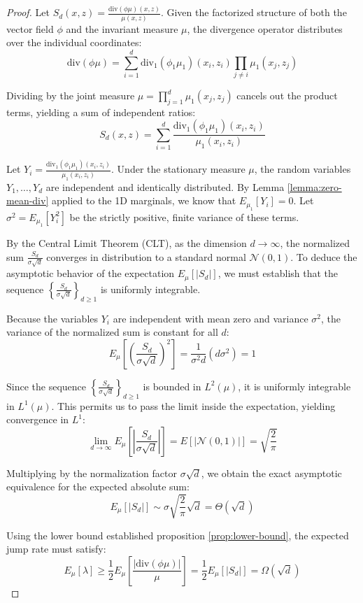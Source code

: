 \documentclass{article}
\begin{document}
\begin{proof}
    Let $S_d(x,z) = \frac{\text{div}(\phi \mu)(x,z)}{\mu(x,z)}$. Given the factorized structure of both the vector field $\phi$ and the invariant measure $\mu$, the divergence operator distributes over the individual coordinates:
    $$ \text{div}(\phi\mu) = \sum_{i=1}^d \text{div}_1(\phi_1 \mu_1)(x_i, z_i) \prod_{j \neq i} \mu_1(x_j, z_j) $$

    Dividing by the joint measure $\mu = \prod_{j=1}^d \mu_1(x_j, z_j)$ cancels out the product terms, yielding a sum of independent ratios:
    $$ S_d(x,z) = \sum_{i=1}^d \frac{\text{div}_1(\phi_1 \mu_1)(x_i, z_i)}{\mu_1(x_i, z_i)} $$

    Let $Y_i = \frac{\text{div}_1(\phi_1 \mu_1)(x_i, z_i)}{\mu_1(x_i, z_i)}$. Under the stationary measure $\mu$, the random variables $Y_1, \dots, Y_d$ are independent and identically distributed. By Lemma \ref{lemma:zero-mean-div} applied to the 1D marginals, we know that $E_{\mu_1}[Y_i] = 0$. Let $\sigma^2 = E_{\mu_1}[Y_i^2]$ be the strictly positive, finite variance of these terms.

    By the Central Limit Theorem (CLT), as the dimension $d \to \infty$, the normalized sum $\frac{S_d}{\sigma \sqrt{d}}$ converges in distribution to a standard normal $\mathcal{N}(0, 1)$. To deduce the asymptotic behavior of the expectation $E_\mu[|S_d|]$, we must establish that the sequence $\left\{ \frac{S_d}{\sigma \sqrt{d}} \right\}_{d \ge 1}$ is uniformly integrable. 

    Because the variables $Y_i$ are independent with mean zero and variance $\sigma^2$, the variance of the normalized sum is constant for all $d$:
    $$ E_\mu\left[ \left( \frac{S_d}{\sigma \sqrt{d}} \right)^2 \right] = \frac{1}{\sigma^2 d} (d \sigma^2) = 1 $$

    Since the sequence $\left\{ \frac{S_d}{\sigma \sqrt{d}} \right\}_{d \ge 1}$ is bounded in $L^2(\mu)$, it is uniformly integrable in $L^1(\mu)$. This permits us to pass the limit inside the expectation, yielding convergence in $L^1$:
    $$ \lim_{d \to \infty} E_\mu\left[ \left| \frac{S_d}{\sigma \sqrt{d}} \right| \right] = E[|\mathcal{N}(0, 1)|] = \sqrt{\frac{2}{\pi}} $$

    Multiplying by the normalization factor $\sigma \sqrt{d}$, we obtain the exact asymptotic equivalence for the expected absolute sum:
    $$ E_\mu[|S_d|] \sim \sigma \sqrt{\frac{2}{\pi}} \sqrt{d} = \Theta(\sqrt{d}) $$

    Using the lower bound established proposition \ref{prop:lower-bound}, the expected jump rate must satisfy:
    $$ E_\mu[\lambda] \geq \frac{1}{2} E_\mu\left[ \frac{|\text{div}(\phi \mu)|}{\mu} \right] = \frac{1}{2} E_\mu[|S_d|] = \Omega(\sqrt{d}) $$


\end{proof}
\end{document}
